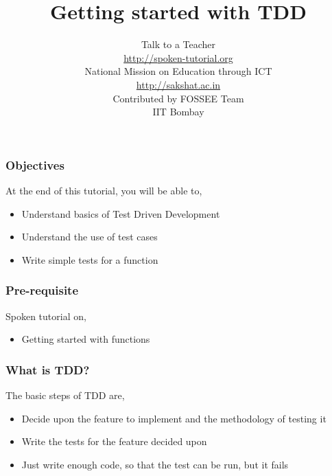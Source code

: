 \documentclass[17pt,compress]{beamer}
\author[FOSSEE]{}
\institute[IIT Bombay]{}
\date[]{}
\begin{document}
\sffamily \bfseries
\title
[Getting started with TDD]
{Getting started with TDD}
\author
[FOSSEE]
{\small Talk to a Teacher\\{\color{blue}\url{http://spoken-tutorial.org}}
\\\vspace{0.25cm}National Mission on Education
 through ICT\\{\color{blue}\url{ http://sakshat.ac.in}} \\ [1.65cm]
   Contributed by FOSSEE Team \\IIT Bombay  \\[0.3cm]
}

\begin{frame}
   \titlepage
\end{frame}


\begin{frame}
  \frametitle{Objectives}
  At the end of this tutorial, you will be able to,
  \begin{itemize}
  \item Understand basics of Test Driven Development
  \item Understand the use of test cases
  \item Write simple tests for a function
 
  \end{itemize}
\end{frame}

\begin{frame}
\frametitle{Pre-requisite}
\label{sec-3}

Spoken tutorial on,
\begin{itemize}
\item Getting started with functions
\end{itemize}
\end{frame}


\begin{frame}
  \frametitle{What is TDD?}
  The basic steps of TDD are,
  \begin{itemize}
  \item Decide upon the feature to implement and the methodology of
    testing it
  \item Write the tests for the feature decided upon
  \item Just write enough code, so that the test can be run, but it fails
   \end{itemize}
\end{frame}
\end{document}
